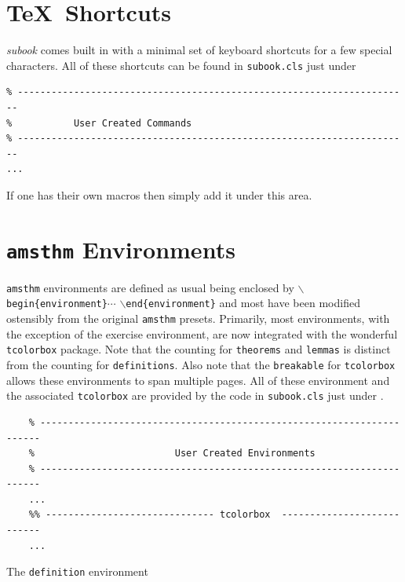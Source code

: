 \documentclass[]{subook}
\begin{document}
\section{\TeX\ Shortcuts}\label{sec:shortcuts}
\textit{subook} comes built in with a minimal set of keyboard shortcuts for a few special characters. All of these shortcuts can be found in \texttt{subook.cls} just under
\begin{verbatim}
% ----------------------------------------------------------------------
%           User Created Commands
% ----------------------------------------------------------------------
...
\end{verbatim}
If one has their own macros then simply add it under this area. 


\section{\texttt{amsthm} Environments}\label{Sub:Special}
\texttt{amsthm} environments are defined as usual being enclosed by \texttt{$\backslash$begin\{environment\}}$\cdots$ \texttt{$\backslash$end\{environment\}} 
and most have been modified ostensibly from the original \texttt{amsthm} presets. 
Primarily, most environments, 
with the exception of the exercise environment, are now integrated with the wonderful \texttt{tcolorbox} package. 
Note that the counting for \texttt{theorems} and \texttt{lemmas} is distinct from the counting for \texttt{definitions}. 
Also note that the \texttt{breakable} for \texttt{tcolorbox} allows these environments to span multiple pages.
All of these environment and the associated \texttt{tcolorbox} are provided by the  code in \texttt{subook.cls} just under \lecture.
\begin{verbatim}
    % ----------------------------------------------------------------------
    %                         User Created Environments 
    % ----------------------------------------------------------------------
    ...
    %% ------------------------------ tcolorbox  ---------------------------
    ...
\end{verbatim}

\begin{definition}[Test]
    The \texttt{definition} environment
\end{definition}
\end{document}
